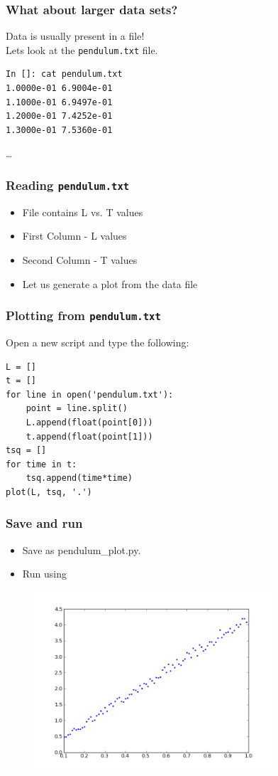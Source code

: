\documentclass[14pt,compress]{beamer}
\newcounter{time}
\newcommand{\typ}[1]{\lstinline{#1}}
\newcommand{\kwrd}[1]{ \texttt{\textbf{\color{blue}{#1}}}  }
\begin{document}
\begin{frame}[fragile]
\frametitle{What about larger data sets?}
\alert{Data is usually present in a file!} \\
Lets look at the \typ{pendulum.txt} file.
\begin{lstlisting} 
In []: cat pendulum.txt 
1.0000e-01 6.9004e-01
1.1000e-01 6.9497e-01
1.2000e-01 7.4252e-01
1.3000e-01 7.5360e-01
\end{lstlisting}  %
\ldots
\end{frame}

\begin{frame}[fragile]
\frametitle{Reading \typ{pendulum.txt}}
\begin{itemize}
  \item File contains L vs. T values 
  \item First Column - L values
  \item Second Column - T values
  \item Let us generate a plot from the data file
\end{itemize}
\end{frame}

\begin{frame}[fragile]
\frametitle{Plotting from \typ{pendulum.txt}}
Open a new script and type the following:
\begin{lstlisting}
L = []
t = []
for line in open('pendulum.txt'):
    point = line.split()
    L.append(float(point[0]))
    t.append(float(point[1]))
tsq = []
for time in t:
    tsq.append(time*time)
plot(L, tsq, '.')
\end{lstlisting}
\end{frame}

\begin{frame}
\frametitle{Save and run}
\begin{itemize}
  \item Save as pendulum\_plot.py.
  \item Run using \kwrd{\%run -i pendulum\_plot.py}
\end{itemize}
\end{frame}

\begin{frame}[fragile]
\begin{figure}
\includegraphics[width=3.5in]{data/L-Tsq.png}
\end{figure}
\end{frame}
\end{document}
